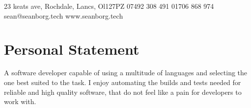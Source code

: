 \documentclass{my_cv}
\begin{document}
\contactInfo
{23 keats ave, Rochdale, Lancs, Ol127PZ}
{07492 308 491}
{01706 868 974}
{sean@seanborg.tech}
{www.seanborg.tech}

\section{Personal Statement}

A software developer capable of using a multitude of languages and selecting the one best suited to the task. I enjoy automating the builds and tests needed for reliable and high quality software, that do not feel like a pain for developers to work with.



\end{document}
